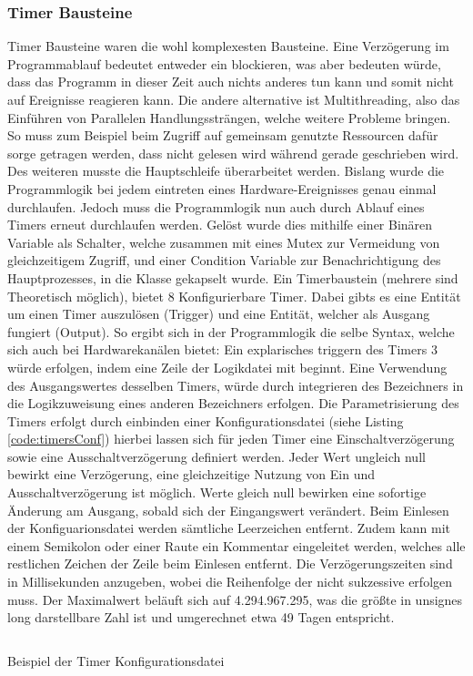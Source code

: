 \subsubsection{Timer Bausteine}
Timer Bausteine waren die wohl komplexesten Bausteine. Eine Verzögerung im Programmablauf bedeutet entweder ein blockieren, was aber bedeuten würde, dass das Programm in dieser Zeit auch nichts anderes tun kann und somit nicht auf Ereignisse reagieren kann. Die andere alternative ist Multithreading, also das Einführen von Parallelen Handlungssträngen, welche weitere Probleme bringen. So muss zum Beispiel beim Zugriff auf gemeinsam genutzte Ressourcen dafür sorge getragen werden, dass nicht gelesen wird während gerade geschrieben wird. Des weiteren musste die Hauptschleife überarbeitet werden. Bislang wurde die Programmlogik bei jedem eintreten eines Hardware-Ereignisses genau einmal durchlaufen. Jedoch muss die Programmlogik nun auch durch Ablauf eines Timers erneut durchlaufen werden. Gelöst wurde dies mithilfe einer Binären Variable als Schalter, welche zusammen mit eines Mutex zur Vermeidung von gleichzeitigem Zugriff, und einer Condition Variable zur Benachrichtigung des Hauptprozesses, in die Klasse  gekapselt wurde. 
Ein Timerbaustein (mehrere sind Theoretisch möglich), bietet 8 Konfigurierbare Timer. Dabei gibts es eine Entität um einen Timer auszulösen  (Trigger) und eine Entität, welcher als Ausgang fungiert  (Output). So ergibt sich in der Programmlogik die selbe Syntax, welche sich auch bei Hardwarekanälen bietet: Ein explarisches triggern des Timers 3 würde erfolgen, indem eine Zeile der Logikdatei mit  beginnt. Eine Verwendung des Ausgangswertes desselben Timers, würde durch integrieren des Bezeichners \chphl{[To3]} in die Logikzuweisung eines anderen Bezeichners erfolgen. Die Parametrisierung des Timers erfolgt durch einbinden einer Konfigurationsdatei (siehe Listing \ref{code:timersConf}) hierbei lassen sich für jeden Timer eine Einschaltverzögerung sowie eine Ausschaltverzögerung definiert werden. Jeder Wert ungleich null bewirkt eine Verzögerung, eine gleichzeitige Nutzung von Ein und Ausschaltverzögerung ist möglich. Werte gleich null bewirken eine sofortige Änderung am Ausgang, sobald sich der Eingangswert verändert. Beim Einlesen der Konfiguarionsdatei werden sämtliche Leerzeichen entfernt. Zudem kann mit einem Semikolon \chphl{;} oder einer Raute \chphl{\#} ein Kommentar eingeleitet werden, welches alle restlichen Zeichen der Zeile beim Einlesen entfernt. Die Verzögerungszeiten sind in Millisekunden anzugeben, wobei die Reihenfolge der nicht sukzessive erfolgen muss. Der Maximalwert beläuft sich auf 4.294.967.295, was die größte in unsignes long darstellbare Zahl ist und umgerechnet etwa 49 Tagen entspricht. 
\begin{listing}[H]
	\inputminted[numbersep=1pt,fontsize=\scriptsize,frame=single, firstline=14,lastline=25]{c}{./code/timers.conf}
	\caption{Beispiel der Timer Konfigurationsdatei}
	\label{code:timersConf}
\end{listing}


